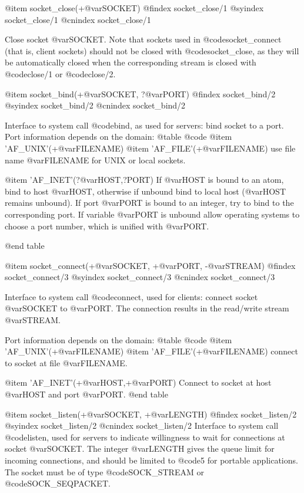 {{{{{{@item socket_close(+@var{SOCKET})
@findex socket_close/1
@syindex socket_close/1
@cnindex socket_close/1

Close socket @var{SOCKET}. Note that sockets used in
@code{socket_connect} (that is, client sockets) should not be closed with
@code{socket_close}, as they will be automatically closed when the
corresponding stream is closed with @code{close/1} or @code{close/2}.

@item socket_bind(+@var{SOCKET}, ?@var{PORT})
@findex socket_bind/2
@syindex socket_bind/2
@cnindex socket_bind/2

Interface to system call @code{bind}, as used for servers: bind socket
to a port. Port information depends on the domain:
@table @code
@item 'AF_UNIX'(+@var{FILENAME})
@item 'AF_FILE'(+@var{FILENAME})
use file name @var{FILENAME} for UNIX or local sockets.

@item 'AF_INET'(?@var{HOST},?PORT)
If @var{HOST} is bound to an atom, bind to host @var{HOST}, otherwise
if unbound bind to local host (@var{HOST} remains unbound). If port
@var{PORT} is bound to an integer, try to bind to the corresponding
port. If variable @var{PORT} is unbound allow operating systems to
choose a port number, which is unified with @var{PORT}.

@end table

@item socket_connect(+@var{SOCKET}, +@var{PORT}, -@var{STREAM})
@findex socket_connect/3
@syindex socket_connect/3
@cnindex socket_connect/3

Interface to system call @code{connect}, used for clients: connect
socket @var{SOCKET} to @var{PORT}. The connection results in the
read/write stream @var{STREAM}.

Port information depends on the domain:
@table @code
@item 'AF_UNIX'(+@var{FILENAME})
@item 'AF_FILE'(+@var{FILENAME})
connect to socket at file @var{FILENAME}.

@item 'AF_INET'(+@var{HOST},+@var{PORT})
Connect to socket at host @var{HOST} and port @var{PORT}.
@end table

@item socket_listen(+@var{SOCKET}, +@var{LENGTH})
@findex socket_listen/2
@syindex socket_listen/2
@cnindex socket_listen/2
Interface to system call @code{listen}, used for servers to indicate
willingness to wait for connections at socket @var{SOCKET}. The
integer @var{LENGTH} gives the queue limit for incoming connections,
and should be limited to @code{5} for portable applications. The socket
must be of type @code{SOCK_STREAM} or @code{SOCK_SEQPACKET}.

}}}}}}
